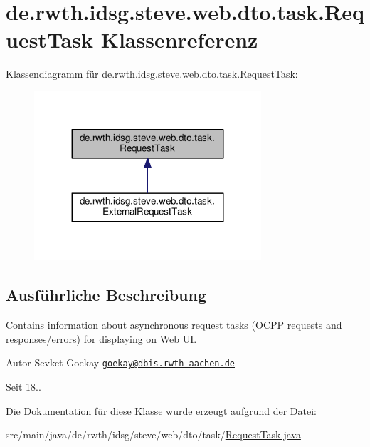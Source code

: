 \hypertarget{classde_1_1rwth_1_1idsg_1_1steve_1_1web_1_1dto_1_1task_1_1_request_task}{\section{de.\+rwth.\+idsg.\+steve.\+web.\+dto.\+task.\+Request\+Task Klassenreferenz}
\label{classde_1_1rwth_1_1idsg_1_1steve_1_1web_1_1dto_1_1task_1_1_request_task}
}


Klassendiagramm für de.\+rwth.\+idsg.\+steve.\+web.\+dto.\+task.\+Request\+Task\+:\nopagebreak
\begin{figure}[H]
\begin{center}
\leavevmode
\includegraphics[width=239pt]{classde_1_1rwth_1_1idsg_1_1steve_1_1web_1_1dto_1_1task_1_1_request_task__inherit__graph}
\end{center}
\end{figure}


\subsection{Ausführliche Beschreibung}
Contains information about asynchronous request tasks (O\+C\+P\+P requests and responses/errors) for displaying on Web U\+I.

\begin{DoxyAuthor}{Autor}
Sevket Goekay \href{mailto:goekay@dbis.rwth-aachen.de}{\tt goekay@dbis.\+rwth-\/aachen.\+de} 
\end{DoxyAuthor}
\begin{DoxySince}{Seit}
18.. 
\end{DoxySince}


Die Dokumentation für diese Klasse wurde erzeugt aufgrund der Datei\+:\begin{DoxyCompactItemize}
\item 
src/main/java/de/rwth/idsg/steve/web/dto/task/\hyperlink{_request_task_8java}{Request\+Task.\+java}\end{DoxyCompactItemize}
